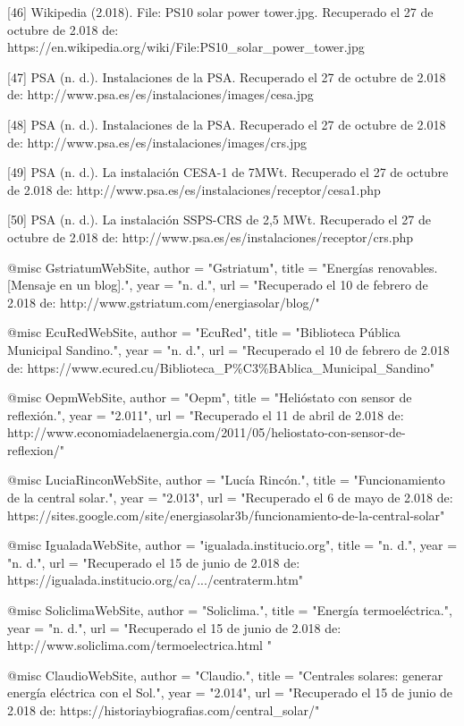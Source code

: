 \documentclass[12pt]{article}
\begin{document}
[46] Wikipedia (2.018). File: PS10 solar power tower.jpg. Recuperado el 27 de octubre de 2.018 de: https://en.wikipedia.org/wiki/File:PS10\_solar\_power\_tower.jpg

[47] PSA (n. d.). Instalaciones de la PSA. Recuperado el 27 de octubre de 2.018 de: http://www.psa.es/es/instalaciones/images/cesa.jpg

[48] PSA (n. d.). Instalaciones de la PSA. Recuperado el 27 de octubre de 2.018 de: http://www.psa.es/es/instalaciones/images/crs.jpg

[49] PSA (n. d.). La instalación CESA-1 de 7MWt. Recuperado el 27 de octubre de 2.018 de: http://www.psa.es/es/instalaciones/receptor/cesa1.php

[50] PSA (n. d.). La instalación SSPS-CRS de 2,5 MWt. Recuperado el 27 de octubre de 2.018 de: http://www.psa.es/es/instalaciones/receptor/crs.php

@misc{ GstriatumWebSite,
	author = "Gstriatum",
	title = "Energías renovables. [Mensaje en un blog].",
	year = "n. d.",
	url = "Recuperado el 10 de febrero de 2.018 de: http://www.gstriatum.com/energiasolar/blog/"
}

@misc{ EcuRedWebSite,
	author = "EcuRed",
	title = "Biblioteca Pública Municipal Sandino.",
	year = "n. d.",
	url = "Recuperado el 10 de febrero de 2.018 de: https://www.ecured.cu/Biblioteca\_P\%C3\%BAblica\_Municipal\_Sandino"
}

@misc{ OepmWebSite,
	author = "Oepm",
	title = "Helióstato con sensor de reflexión.",
	year = "2.011",
	url = "Recuperado el 11 de abril de 2.018 de: http://www.economiadelaenergia.com/2011/05/heliostato-con-sensor-de-reflexion/"
}

@misc{ LuciaRinconWebSite,
	author = "Lucía Rincón.",
	title = "Funcionamiento de la central solar.",
	year = "2.013",
	url = "Recuperado el 6 de mayo de 2.018 de: https://sites.google.com/site/energiasolar3b/funcionamiento-de-la-central-solar"
}

@misc{ IgualadaWebSite,
	author = "igualada.institucio.org",
	title = "n. d.",
	year = "n. d.",
	url = "Recuperado el 15 de junio de 2.018 de: https://igualada.institucio.org/ca/.../centraterm.htm"
}

@misc{ SoliclimaWebSite,
	author = "Soliclima.",
	title = "Energía termoeléctrica.",
	year = "n. d.",
	url = "Recuperado el 15 de junio de 2.018 de: http://www.soliclima.com/termoelectrica.html
"
}

@misc{ ClaudioWebSite,
	author = "Claudio.",
	title = "Centrales solares: generar energía eléctrica con el Sol.",
	year = "2.014",
	url = "Recuperado el 15 de junio de 2.018 de: https://historiaybiografias.com/central_solar/"
}
\end{document}
